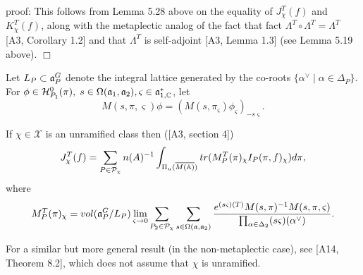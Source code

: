 proof: This follows from Lemma 5.28 above on the
equality of $J_\chi ^T(f)$ and $K_\chi ^T(f)$, along with the
metaplectic analog of the fact that
fact $\Lambda^T\circ \Lambda ^T=\Lambda ^T$
[A3, Corollary 1.2] and that $\Lambda ^T$ is
self-adjoint [A3, Lemma 1.3] (see Lemma 5.19 above). $\Box $

Let $L_P\subset {{\frak{a}}}_P^G$ denote the integral
lattice generated by the
co-roots $\{\alpha ^{\vee }\;|\;\alpha \in \Delta _P\}$. For $\phi \in 
{\cal{H}}_{P_1}^0(\pi ),
\;s\in \Omega ({{\frak{a}}}_1,{{\frak{a}}}_2),\varsigma
\in {{\frak{a}}}_{1,\Bbb{C}}^{*}$, let 
\[
M(s,\pi ,\varsigma )\phi =(M(s,\pi _\varsigma )\phi _\varsigma
)_{-s\varsigma }. 
\]
\begin{theorem}
If $\chi \in \mathcal{X}$ is an unramified class then ([A3, section 4]) 
\[
J_\chi ^T(f)=\sum_{P\in \mathcal{P}_\chi }
n(A)^{-1}\int_{\Pi _u(\overline{M(\mathbb{A} )})}
tr(M_P^T(\pi )_\chi I_P(\pi ,f)_\chi )d\pi ,
\]
where 
\[
M_P^T(\pi )_\chi =vol({{\frak{a}}}_P^G/L_P)\lim_{\varsigma \rightarrow
0}\sum_{P_2\in \mathcal{P}_\chi }
\sum_{s\in \Omega ({{\frak{a}}},{{\frak{a}}}_2)}
\frac{e^{(s\varsigma )(T)}M(s,\pi )^{-1}M(s,\pi ,\varsigma )}{\prod_{\alpha
\in \Delta _2}(s\varsigma )(\alpha ^{\vee })}.
\]
\end{theorem}

For a similar but more general result (in the non-metaplectic case),
see [A14, Theorem 8.2], which does not assume that $\chi$ is unramified.

